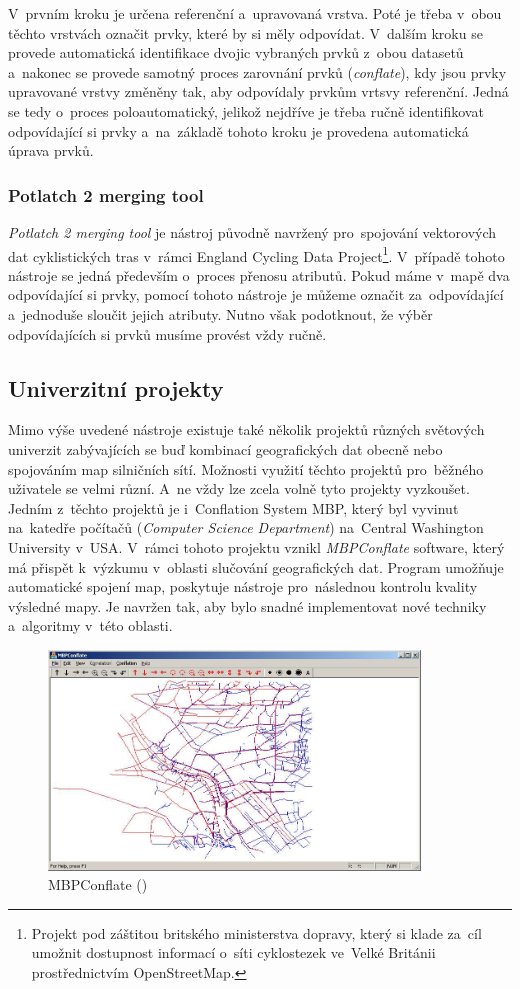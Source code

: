 V~prvním kroku je určena referenční a~upravovaná vrstva. Poté je třeba v~obou
těchto vrstvách označit prvky, které by si měly odpovídat. V~dalším kroku se 
provede automatická identifikace dvojic vybraných prvků z~obou datasetů 
a~nakonec se provede samotný proces zarovnání prvků (\textit{conflate}), kdy 
jsou prvky upravované vrstvy změněny tak, aby odpovídaly prvkům vrtsvy 
referenční. Jedná se tedy o~proces poloautomatický, jelikož nejdříve je třeba
ručně identifikovat odpovídající si prvky a~na~základě tohoto kroku je 
provedena automatická úprava prvků.


\subsubsection{Potlatch 2 merging tool}

\textit{Potlatch 2 merging tool} je nástroj původně navržený pro~spojování 
vektorových dat cyklistických tras v~rámci England Cycling Data 
Project\footnote{Projekt pod záštitou britského ministerstva dopravy, 
který si klade za~cíl umožnit dostupnost informací o~síti cyklostezek
ve~Velké Británii prostřednictvím OpenStreetMap.}. %
V~případě tohoto nástroje se jedná především o~proces přenosu atributů. 
Pokud máme v~mapě dva odpovídající si prvky, pomocí tohoto nástroje je 
můžeme označit za~odpovídající a~jednoduše sloučit jejich atributy. Nutno 
však podotknout, že výběr odpovídajících si prvků musíme provést vždy ručně. 


\subsection{Univerzitní projekty}
\label{univerzitní}

Mimo výše uvedené nástroje existuje také několik projektů různých světových
univerzit zabývajících se buď kombinací geo\-grafických dat obecně nebo 
spojováním map silničních sítí. Možnosti využití těchto projektů pro~běžného
uživatele se velmi různí. A~ne vždy lze zcela volně tyto projekty vyzkoušet. 
Jedním z~těchto projektů je i~Conflation System MBP, který byl vyvinut 
na~katedře počítačů (\textit{Computer Science Department}) na~Central Washington 
University v~USA. V~rámci tohoto projektu vznikl \textit{MBPConflate} 
software, který má přispět k~výzkumu v~oblasti slučování geo\-grafických dat. 
Program umožňuje automatické spojení map, poskytuje nástroje pro~následnou 
kontrolu kvali\-ty výsledné mapy. Je navržen tak, aby bylo snadné implementovat
nové techniky a~algoritmy v~této oblasti.  

\label{mbppic}
  \begin{figure}[hbt]
    \centering
      \includegraphics[width=280pt]{./pictures/MBPconflate.png}
      \caption{MBPConflate ()}
      \label{fig:mbp}
  \end{figure}
